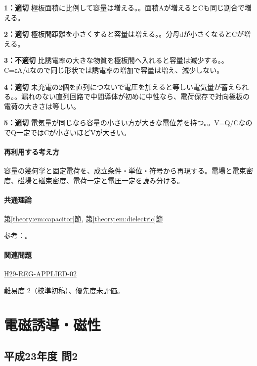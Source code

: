 \noindent\textbf{1：適切} 極板面積に比例して容量は増える。。面積Aが増えるとCも同じ割合で増える。\par

\noindent\textbf{2：適切} 極板間距離を小さくすると容量は増える。。分母dが小さくなるとCが増える。\par

\noindent\textbf{3：不適切} 比誘電率の大きな物質を極板間へ入れると容量は減少する。。C=εA/dなので同じ形状では誘電率の増加で容量は増え、減少しない。\par

\noindent\textbf{4：適切} 未充電の2個を直列につないで電圧を加えると等しい電気量が蓄えられる。。漏れのない直列回路で中間導体が初めに中性なら、電荷保存で対向極板の電荷の大きさは等しい。\par

\noindent\textbf{5：適切} 電気量が同じなら容量の小さい方が大きな電位差を持つ。。V=\allowbreak{}Q/CなのでQ一定ではCが小さいほどVが大きい。\par

\paragraph{再利用する考え方} 容量の幾何学と固定電荷を、成立条件・単位・符号から再現する。電場と電束密度、磁場と磁束密度、電荷一定と電圧一定を読み分ける。

\paragraph{共通理論} \hyperref[theory:em:capacitor]{第\ref*{theory:em:capacitor}節}, \hyperref[theory:em:dielectric]{第\ref*{theory:em:dielectric}節}

\par 参考：\cite{mit_em05}。

\paragraph{関連問題} \hyperref[q:h29-reg-applied-02]{H29-REG-APPLIED-02}

\par 難易度 2（校準初稿）、優先度未評価。

\section{電磁誘導・磁性}

\subsection{平成23年度 問2}
\label{q:h23-reg-applied-02}

